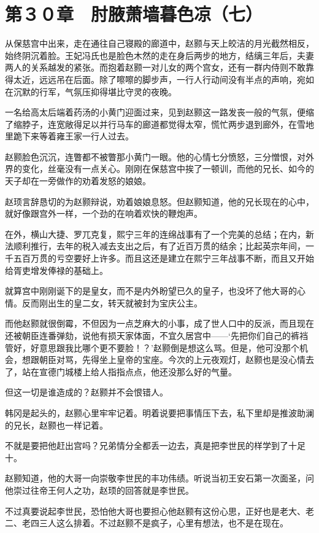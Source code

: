 \section{第３０章　肘腋萧墙暮色凉（七）}

从保慈宫中出来，走在通往自己寝殿的廊道中，赵颢与天上皎洁的月光截然相反，始终阴沉着脸。王妃冯氏也是脸色木然的走在身后两步的地方，结缡三年后，夫妻两人的关系越发的紧张。而抱着赵颢一对儿女的两个宫女，还有一群内侍则不敢靠得太近，远远吊在后面。除了嚓嚓的脚步声，一行人行动间没有半点的声响，宛如在沉默的行军，气氛压抑得堪比守灵的夜晚。

一名给高太后端着药汤的小黄门迎面过来，见到赵颢这一路发丧一般的气氛，便缩了缩脖子，连宽敞得足以并行马车的廊道都觉得太窄，慌忙两步退到廊外，在雪地里跪下来等着雍王家一行人过去。

赵颢脸色沉沉，连瞥都不被瞥那小黄门一眼。他的心情七分愤怒，三分憎恨，对外界的变化，丝毫没有一点关心。刚刚在保慈宫中挨了一顿训，而他的兄长、如今的天子却在一旁做作的劝着发怒的娘娘。

赵顼言辞恳切的为赵颢辩说，劝着娘娘息怒。但赵颢知道，他的兄长现在的心中，就好像跟宫外一样，一个劲的在响着欢快的鞭炮声。

在外，横山大捷、罗兀克复，熙宁三年的连绵战事有了一个完美的总结；在内，新法顺利推行，去年的税入减去支出之后，有了近百万贯的结余；比起英宗年间，一千五百万贯的亏空要好上许多。而且这还是建立在熙宁三年战事不断，而且又开始给胥吏增发俸禄的基础上。

就算宫中刚刚诞下的是皇女，而不是内外盼望已久的皇子，也没坏了他大哥的心情。反而刚出生的皇二女，转天就被封为宝庆公主。

而他赵颢就很倒霉，不但因为一点芝麻大的小事，成了世人口中的反派，而且现在还被朝臣连番弹劾，说他有损天家体面，不宜久居宫中——‘先把你们自己的裤裆管好，好意思跟我比哪个更不要脸！？’赵颢倒是想这么骂。但是，他可没那个机会，想跟朝臣对骂，先得坐上皇帝的宝座。今次的上元夜观灯，赵颢也是没心情去了，站在宣德门城楼上给人指指点点，他还没那么好的气量。

但这一切是谁造成的？赵颢并不会恨错人。

韩冈是起头的，赵颢心里牢牢记着。明着说要把事情压下去，私下里却是推波助澜的兄长，赵颢也一样记着。

不就是要把他赶出宫吗？兄弟情分全都丢一边去，真是把李世民的样学到了十足十。

赵颢知道，他的大哥一向崇敬李世民的丰功伟绩。听说当初王安石第一次面圣，问他崇过往帝王何人之功，赵顼的回答就是李世民。

不过真要说起李世民，恐怕他大哥也要担心他赵颢有这份心思，正好也是老大、老二、老四三人这么排着。不过赵颢不是疯子，心里有想法，也不是在现在。


